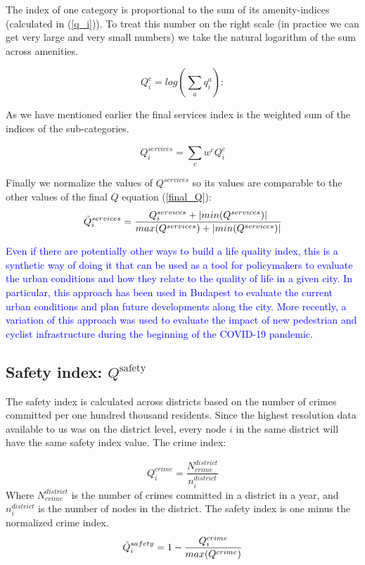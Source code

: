The index of one category is proportional to the sum of its amenity-indices (calculated in (\ref{q_i})). To treat this number on the right scale (in practice we can get very large and very small numbers) we take the natural logarithm of the sum across amenities.

\begin{equation}
	Q_i^c=log(\sum_a q_i^a):
\end{equation}

As we have mentioned earlier the final services index is the weighted sum of the indices of the sub-categories.

$$Q_i^{services} =\sum_c w^cQ_i^c $$

Finally we normalize the values of $Q^{services}$ so its values are comparable to the other values of the final $Q$ equation (\ref{final_Q}):
\begin{equation}
	\Tilde{Q}_i^{services} =\frac{Q_i^{services}+|min(Q^{services})|}{max(Q^{services})+|min(Q^{services})|}
\end{equation}

\textcolor{blue}{Even if there are potentially other ways to build a life quality index, this is a synthetic way of doing it that can be used as a tool for policymakers to evaluate the urban conditions and how they relate to the quality of life in a given city. In particular, this approach has been used in Budapest to evaluate the current urban conditions and plan future developments along the city. More recently, a variation of this approach was used to evaluate the impact of new pedestrian and cyclist infrastructure during the beginning of the COVID-19 pandemic.}

\subsection{Safety index: \texorpdfstring{$Q^{\text{safety}}$}{Q\^safety}} \label{safety}

The safety index is calculated across districts based on the number of crimes committed per one hundred thousand residents. Since the highest resolution data available to us was on the district level, every node $i$ in the same district will have the same safety index value. The crime index:

$$Q_i^{crime}=\frac{N^{district}_{crime}}{n_i^{district}}$$
Where $N^{district}_{crime}$ is the number of crimes committed in a district in a year, and $n_i^{district}$ is the number of nodes in the district. The safety index is one minus the normalized crime index.
\begin{equation}
	\Tilde{Q}_i^{safety}=1-\frac{Q_i^{crime}}{max(Q^{crime})}
\end{equation}

